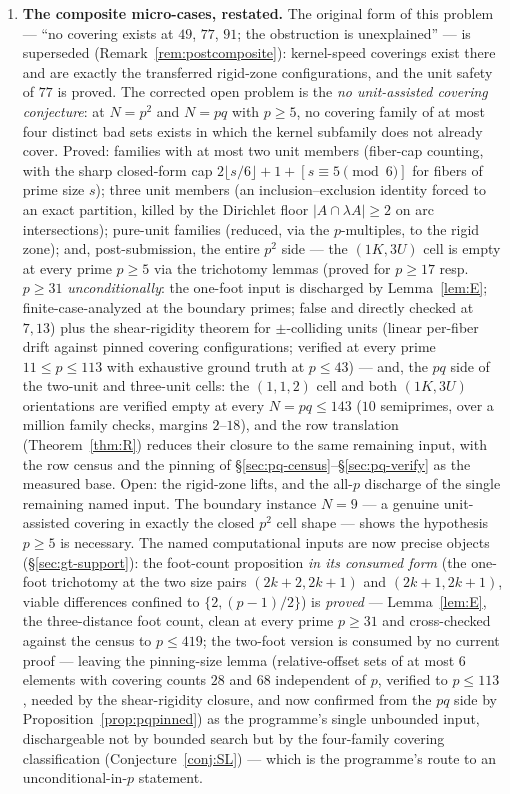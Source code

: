 \documentclass[11pt,a4paper]{article}
\numberwithin{equation}{section}
\theoremstyle{plain}
\theoremstyle{definition}
\theoremstyle{remark}
\begin{document}
\begin{enumerate}[leftmargin=1.7em,itemsep=4pt]
\item \textbf{The composite micro-cases, restated.} The original form of
  this problem --- ``no covering exists at $49$, $77$, $91$; the
  obstruction is unexplained'' --- is superseded
  (Remark~\ref{rem:postcomposite}): kernel-speed coverings exist there and
  are exactly the transferred rigid-zone configurations, and the unit
  safety of $77$ is proved. The corrected open problem is the \emph{no
  unit-assisted covering conjecture}: at $N=p^2$ and $N=pq$ with $p\ge5$,
  no covering family of at most four distinct bad sets exists in which the
  kernel subfamily does not already cover. Proved: families with at most
  two unit members (fiber-cap counting, with the sharp closed-form cap
  $2\lfloor s/6\rfloor+1+[s\equiv5\pmod6]$ for fibers of prime size $s$);
  three unit members (an inclusion--exclusion identity forced to an exact
  partition, killed by the Dirichlet floor $|A\cap\lambda A|\ge2$ on arc
  intersections); pure-unit families (reduced, via the $p$-multiples,
  to the rigid zone); and, post-submission, the entire $p^2$ side --- the
  $(1K,3U)$ cell is empty at every prime $p\ge5$ via the trichotomy
  lemmas (proved for $p\ge17$ resp.\ $p\ge31$ \emph{unconditionally}: the
  one-foot input is discharged by Lemma~\ref{lem:E}; finite-case-analyzed
  at the boundary primes; false and directly checked at $7,13$) plus the
  shear-rigidity theorem for $\pm$-colliding units
  (linear per-fiber drift against pinned covering configurations;
  verified at every prime $11\le p\le113$ with exhaustive ground truth at $p\le43$) --- and, the $pq$ side of
  the two-unit and three-unit cells: the $(1,1,2)$ cell and both
  $(1K,3U)$ orientations are verified empty at every $N=pq\le143$ ($10$
  semiprimes, over a million family checks, margins $2$--$18$), and the
  row translation (Theorem~\ref{thm:R}) reduces their closure to the same
  remaining input, with the row census and the pinning of
  \S\ref{sec:pq-census}--\S\ref{sec:pq-verify} as the measured base.
  Open: the rigid-zone lifts, and the all-$p$ discharge of the single
  remaining named input. The boundary
  instance $N=9$ --- a genuine unit-assisted covering in exactly the
  closed $p^2$ cell shape --- shows the hypothesis $p\ge5$ is necessary.
  The named computational inputs are now precise
  objects (\S\ref{sec:gt-support}): the foot-count proposition \emph{in
  its consumed form} (the one-foot trichotomy at the two size pairs
  $(2k{+}2,2k{+}1)$ and $(2k{+}1,2k{+}1)$, viable differences confined to
  $\{2,(p-1)/2\}$) is \emph{proved} --- Lemma~\ref{lem:E}, the
  three-distance foot count, clean at every prime $p\ge31$ and
  cross-checked against the census to $p\le419$; the two-foot version is
  consumed by no current proof --- leaving the
  pinning-size lemma (relative-offset sets of at most $6$ elements with
  covering counts $28$ and $68$ independent of $p$, verified to
  $p\le113$, needed by the shear-rigidity closure, and now confirmed from
  the $pq$ side by Proposition~\ref{prop:pqpinned}) as the programme's
  single unbounded input, dischargeable not by
  bounded search but by the four-family covering classification
  (Conjecture~\ref{conj:SL}) --- which is the programme's route to an
  unconditional-in-$p$ statement.


\end{enumerate}
\end{document}
